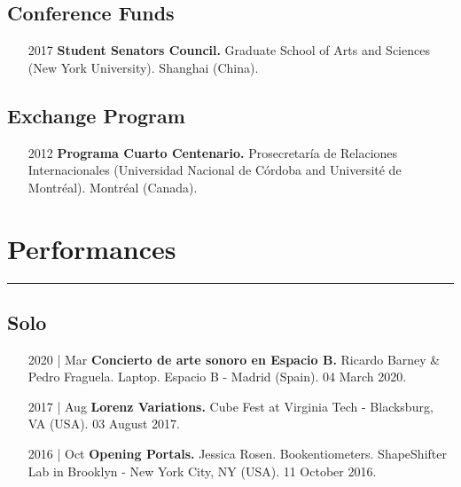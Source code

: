 \documentclass[12pt]{article}%
\begin{document}
\subsection{Conference Funds}%
\begin{itemize}[align=parleft,leftmargin=2.25cm,labelwidth=2cm]
\item[2017]
\textbf{Student Senators Council.}
Graduate School of Arts and Sciences (New York University). 
Shanghai (China). 
\end{itemize}%
\subsection{Exchange Program}%
\begin{itemize}[align=parleft,leftmargin=2.25cm,labelwidth=2cm]
\item[2012]
\textbf{Programa Cuarto Centenario.}
Prosecretaría de Relaciones Internacionales (Universidad Nacional de Córdoba and Université de Montréal). 
Montréal (Canada). 
\end{itemize}

%
\section{Performances}%
\label{sec:Performances}%
\hrule%
\subsection{Solo}%
\begin{itemize}[align=parleft,leftmargin=2.25cm,labelwidth=2cm]
\item[2020 | Mar]
\textbf{Concierto de arte sonoro en Espacio B.}
Ricardo Barney \& Pedro Fraguela. 
Laptop. 
Espacio B {-} Madrid (Spain). 
04 March 2020.
\end{itemize}%
\begin{itemize}[align=parleft,leftmargin=2.25cm,labelwidth=2cm]
\item[2017 | Aug]
\textbf{Lorenz Variations.}
Cube Fest at Virginia Tech {-} Blacksburg, VA (USA). 
03 August 2017.
\end{itemize}%
\begin{itemize}[align=parleft,leftmargin=2.25cm,labelwidth=2cm]
\item[2016 | Oct]
\textbf{Opening Portals.}
Jessica Rosen. 
Bookentiometers. 
ShapeShifter Lab in Brooklyn {-} New York City, NY (USA). 
11 October 2016.
\end{itemize}%
\end{document}

